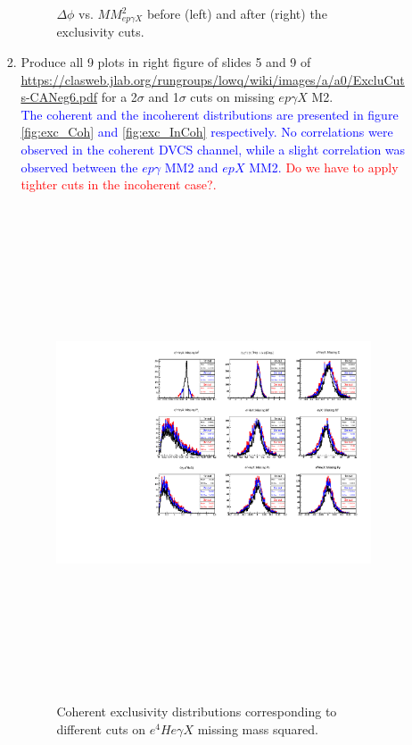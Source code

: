 \begin{enumerate}
\begin{enumerate}
\begin{enumerate}
\begin{figure}[!h]
    \caption{ $\Delta \phi$ vs. $MM^{2}_{ep\gamma X}$ before (left) and 
    after (right) the exclusivity cuts.}
    \label{fig:2d_delta_phi_MM2_InCoh}
    \end{figure}                                                                  


  \item Produce all 9 plots in right figure of slides 5 and 9 of \url{ 
     https://clasweb.jlab.org/rungroups/lowq/wiki/images/a/a0/ExcluCuts-CANeg6.pdf}   
     for a 2$\sigma$ and 1$\sigma$ cuts on missing $ep\gamma X$ M2.\\
     \textcolor{blue}{The coherent and the incoherent distributions are 
        presented in figure \ref{fig:exc_Coh} and \ref{fig:exc_InCoh} 
     respectively. No correlations were observed in the coherent DVCS channel, 
  while a slight correlation was observed between the $ep\gamma$ MM2 and $epX$ 
  MM2.} \textcolor{red}{Do we have to apply tighter cuts in the incoherent 
  case?.}
     \begin{figure}[tbp]
    \includegraphics[height=14.6cm]{fig/all_sigmas_coh_exc_cuts.pdf}
    \caption{Coherent exclusivity distributions corresponding to different cuts 
    on $e^{4}He\gamma X$ missing mass squared.}

\end{figure}
\end{enumerate}
\end{enumerate}
\end{enumerate}
